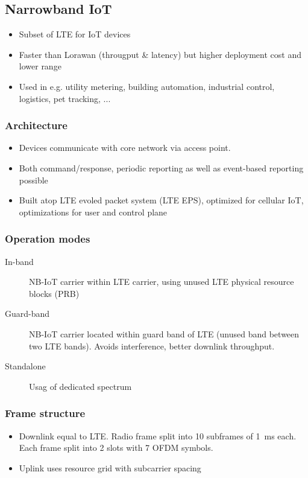 \subsection{Narrowband IoT}

\begin{itemize}
		\item Subset of LTE for IoT devices
		\item Faster than Lorawan (througput \& latency) but higher deployment
				cost and lower range
		\item Used in e.g. utility metering, building automation, industrial
				control, logistics, pet tracking, ...
\end{itemize}

\subsubsection{Architecture}

\begin{itemize}
		\item Devices communicate with core network via access point.
		\item Both command/response, periodic reporting as well as event-based
				reporting possible
		\item Built atop LTE evoled packet system (LTE EPS), optimized for
				cellular IoT, optimizations for user and control plane
\end{itemize}

\subsubsection{Operation modes}

\begin{description}
		\item[In-band] NB-IoT carrier within LTE carrier, using unused LTE
				physical resource blocks (PRB)
		\item[Guard-band] NB-IoT carrier located within guard band of LTE
				(unused band between two LTE bands). Avoids interference,
				better downlink throughput.
		\item[Standalone] Usag of dedicated spectrum
\end{description}

\subsubsection{Frame structure}

\begin{itemize}
		\item Downlink equal to LTE. Radio frame split into 10 subframes of
				\SI{1}{\milli\second} each. Each frame split into 2 slots with
				7 OFDM symbols.
		\item Uplink uses resource grid with subcarrier spacing
\end{itemize}

